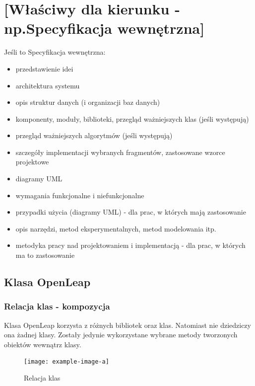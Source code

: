 \chapter{[Właściwy dla kierunku - np.Specyfikacja wewnętrzna]}
Jeśli to Specyfikacja wewnętrzna:
\begin{itemize}
\item przedstawienie idei
\item architektura systemu
\item opis struktur danych (i organizacji baz danych)
\item komponenty, moduły, biblioteki, przegląd ważniejszych klas (jeśli występują)
\item przegląd ważniejszych algorytmów (jeśli występują)
\item szczegóły implementacji wybranych fragmentów, zastosowane wzorce projektowe
\item diagramy UML
\end{itemize}


\begin{itemize}
\item wymagania funkcjonalne i niefunkcjonalne
\item przypadki użycia (diagramy UML) - dla prac, w których mają zastosowanie
\item opis narzędzi, metod eksperymentalnych, metod modelowania itp.
\item metodyka pracy nad projektowaniem i implementacją - dla prac, w których ma to zastosowanie
\end{itemize}

\section{Klasa OpenLeap}

\subsection{Relacja klas - kompozycja}
\quad Klasa OpenLeap korzysta z różnych bibliotek oraz klas. Natomiast nie dziedziczy ona żadnej klasy. Zostały jedynie wykorzystane wybrane metody tworzonych obiektów wewnątrz klasy. 

\begin{figure}[H]
    \begin{center}
        \texttt{[image: example-image-a]}
        \caption{Relacja klas} 
    \end{center}
\end{figure}

